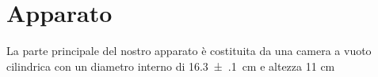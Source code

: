 \section{Apparato}

La parte principale del nostro apparato è costituita da una camera a vuoto cilindrica con un diametro interno di  \SI{16.3(1)}{cm} e altezza 11 cm 
